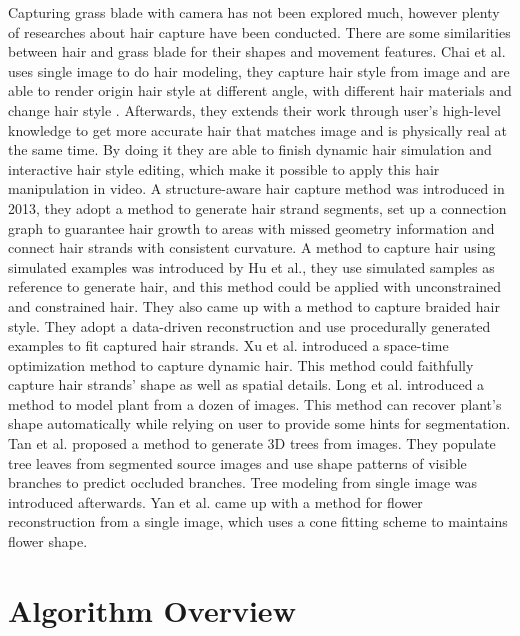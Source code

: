 \documentclass[10pt,journal,compsoc]{IEEEtran}
\begin{document}
Capturing grass blade with camera has not been explored much, however plenty of researches about hair capture have been conducted. There are some similarities between hair and grass blade for their shapes and movement features. Chai et al.\cite{chai2012single} uses single image to do hair modeling, they capture hair style from image and are able to render origin hair style at different angle, with different hair materials and change hair style . Afterwards, they extends their work through user's high-level knowledge to get more accurate hair that matches image and is physically real at the same time. By doing it they are able to finish dynamic hair simulation and interactive hair style editing, which make it possible to apply this hair manipulation in video\cite{chai2013dynamic}. A structure-aware hair capture method\cite{luo2013structure} was introduced in 2013, they adopt a method to generate hair strand segments, set up a connection graph to guarantee hair growth to areas with missed geometry information and connect hair strands with consistent curvature. A method to capture hair using simulated examples was introduced by Hu et al.\cite{hu2014robust}, they use simulated samples as reference to generate hair, and this method could be applied with unconstrained and constrained hair. They also came up with a method to capture braided hair style\cite{hu2014capturing}. They adopt a data-driven reconstruction and use procedurally generated examples to fit captured hair strands. Xu et al. introduced a space-time optimization method to capture dynamic hair. This method could faithfully capture hair strands' shape as well as spatial details. Long et al.\cite{quan2006image} introduced a method to model plant from a dozen of images. This method can recover plant's shape automatically while relying on user to provide some hints for segmentation. Tan et al.\cite{tan2007image} proposed a method to generate 3D trees from images. They populate tree leaves from segmented source images and use shape patterns of visible branches to predict occluded branches. Tree modeling from single image was introduced afterwards\cite{tan2008single}. Yan et al.\cite{yan2014flower} came up with a method for flower reconstruction from a single image, which uses a cone fitting scheme to maintains flower shape.

\section{Algorithm Overview}
\end{document}
